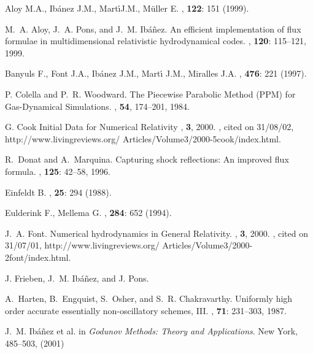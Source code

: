 \documentclass{article}
\begin{document}
\begin{thebibliography}{20}

Aloy M.A., Ib{\'a}nez J.M., Mart\'\i J.M., M{\"u}ller E.
, {\bf 122}: 151 (1999).

M.~A. Aloy, J.~A. Pons, and J.~M. Ib{\'a}{\~n}ez.
\newblock An efficient implementation of flux formulae in multidimensional
  relativistic hydrodynamical codes.
, {\bf 120}: 115--121, 1999.

Banyuls F., Font J.A., Ib{\'a}nez J.M., Mart\'{\i} J.M., Miralles J.A.
, {\bf 476}: 221 (1997).

P. Colella and P.~R. Woodward.
\newblock The {P}iecewise {P}arabolic {M}ethod ({PPM}) for
{G}as-{D}ynamical {S}imulations.
, {\bf 54}, 174--201, 1984.

G. Cook
\newblock Initial Data for Numerical Relativity
, {\bf 3}, 2000.
, cited on 31/08/02,
  http://www.livingreviews.org/ Articles/Volume3/2000-5cook/index.html.

R.~Donat and A.~Marquina.
\newblock Capturing shock reflections: An improved flux formula.
, {\bf 125}: 42--58, 1996.

Einfeldt B.
, {\bf 25}: 294 (1988).

Eulderink F., Mellema G.
, {\bf 284}: 652 (1994).

J.~A. Font.
\newblock Numerical hydrodynamics in {G}eneral {R}elativity.
, {\bf 3}, 2000.
, cited on 31/07/01,
  http://www.livingreviews.org/ Articles/Volume3/2000-2font/index.html.

J. Frieben, J.~M. Ib{\'a}{\~n}ez, and J. Pons.

A.~Harten, B.~Engquist, S.~Osher, and S.~R. Chakravarthy.
\newblock Uniformly high order accurate essentially non-oscillatory schemes,
  {III}.
, {\bf 71}: 231--303, 1987.

J.~M. Ib{\'a}{\~n}ez et al.
\newblock in {\em Godunov Methods: Theory and Applications}.
\newblock New York, 485--503, (2001)


\end{thebibliography}
\end{document}
